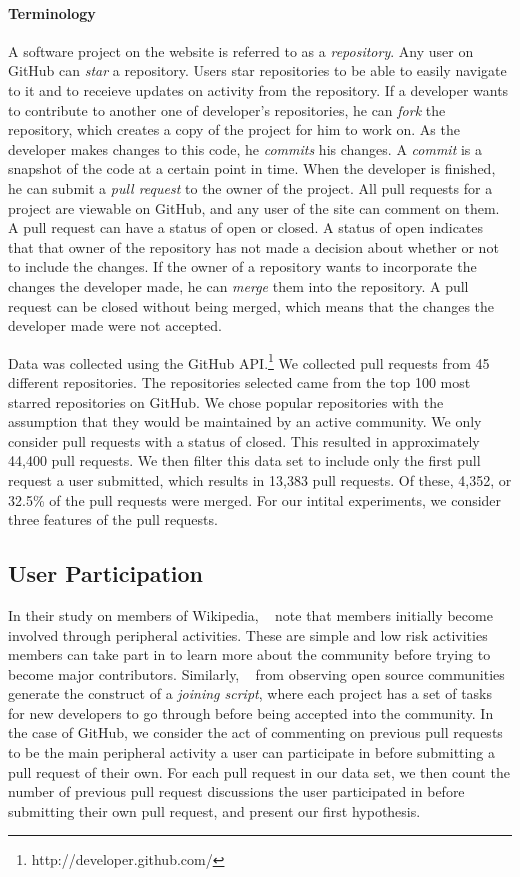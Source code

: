 \documentclass[12pt]{article}
\begin{document}
\paragraph{Terminology} A software project on the website is referred to as a
\textit{repository}. Any user on GitHub can \textit{star} a repository. Users
star repositories to be able to easily navigate to it and to receieve updates on
activity from the repository. If a developer wants to contribute to another one
of developer's repositories, he can \textit{fork} the repository, which creates
a copy of the project for him to work on. As the developer makes changes to this
code, he \textit{commits} his changes. A \textit{commit} is a snapshot of the
code at a certain point in time. When the developer is finished, he can submit a
\textit{pull request} to the owner of the project. All pull requests for a
project are viewable on GitHub, and any user of the site can comment on them. A
pull request can have a status of open or closed. A status of open indicates
that that owner of the repository has not made a decision about whether or not
to include the changes. If the owner of a repository wants to incorporate the
changes the developer made, he can \textit{merge} them into the repository. A
pull request can be closed without being merged, which means that the changes
the developer made were not accepted.

Data was collected using the GitHub API.\footnote{http://developer.github.com/}
We collected pull requests from 45 different repositories. The repositories
selected came from the top 100 most starred repositories on GitHub. We chose
popular repositories with the assumption that they would be maintained by an
active community. We only consider pull requests with a status of closed. This
resulted in approximately 44,400 pull requests. We then filter this data set to
include only the first pull request a user submitted, which results in 13,383
pull requests. Of these, 4,352, or 32.5\% of the pull requests were merged. For
our intital experiments, we consider three features of the pull requests.

\subsection{User Participation}
In their study on members of Wikipedia, ~\cite{bryant_becoming_2005} note that
members initially become involved through peripheral activities. These are
simple and low risk activities members can take part in to learn more about the
community before trying to become major contributors. Similarly,
~\cite{von_krogh_community_2003} from observing open source communities generate
the construct of a \textit{joining script}, where each project has a set of
tasks for new developers to go through before being accepted into the community.
In the case of GitHub, we consider the act of commenting on previous pull
requests to be the main peripheral activity a user can participate in before
submitting a pull request of their own. For each pull request in our data set,
we then count the number of previous pull request discussions the user
participated in before submitting their own pull request, and present our first
hypothesis.
\end{document}
